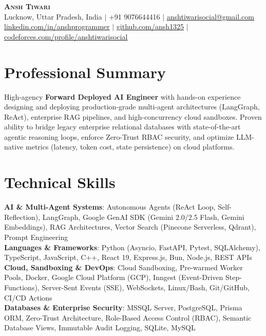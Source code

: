 \documentclass[letterpaper,10pt]{article}
\begin{document}
\begin{center}
    \textbf{\Huge \scshape Ansh Tiwari} \\ \vspace{2pt}
    \small Lucknow, Uttar Pradesh, India $|$ +91 9076644416 $|$ \href{mailto:anshtiwarisocial@gmail.com}{\underline{anshtiwarisocial@gmail.com}} \\ \vspace{2pt}
    \href{https://linkedin.com/in/anshprogrammer}{\underline{linkedin.com/in/anshprogrammer}} $|$ 
    \href{https://github.com/ansh1325}{\underline{github.com/ansh1325}} $|$ 
    \href{https://codeforces.com/profile/anshtiwarisocial}{\underline{codeforces.com/profile/anshtiwarisocial}}
\end{center}

\section{Professional Summary}
\small{High-agency \textbf{Forward Deployed AI Engineer} with hands-on experience designing and deploying production-grade multi-agent architectures (LangGraph, ReAct), enterprise RAG pipelines, and high-concurrency cloud sandboxes. Proven ability to bridge legacy enterprise relational databases with state-of-the-art agentic reasoning loops, enforce Zero-Trust RBAC security, and optimize LLM-native metrics (latency, token cost, state persistence) on cloud platforms.}

\section{Technical Skills}
 \begin{itemize}[leftmargin=0.15in, label={}]
    \small{\item{
     \textbf{AI \& Multi-Agent Systems}{: Autonomous Agents (ReAct Loop, Self-Reflection), LangGraph, Google GenAI SDK (Gemini 2.0/2.5 Flash, Gemini Embeddings), RAG Architectures, Vector Search (Pinecone Serverless, Qdrant), Prompt Engineering} \\
     \textbf{Languages \& Frameworks}{: Python (Asyncio, FastAPI, Pytest, SQLAlchemy), TypeScript, JavaScript, C++, React 19, Express.js, Bun, Node.js, REST APIs} \\
     \textbf{Cloud, Sandboxing \& DevOps}{: Cloud Sandboxing, Pre-warmed Worker Pools, Docker, Google Cloud Platform (GCP), Inngest (Event-Driven Step-Functions), Server-Sent Events (SSE), WebSockets, Linux/Bash, Git/GitHub, CI/CD Actions} \\
     \textbf{Databases \& Enterprise Security}{: MSSQL Server, PostgreSQL, Prisma ORM, Zero-Trust Architecture, Role-Based Access Control (RBAC), Semantic Database Views, Immutable Audit Logging, SQLite, MySQL}
    }}
 \end{itemize}
 \vspace{-9pt}
\end{document}

